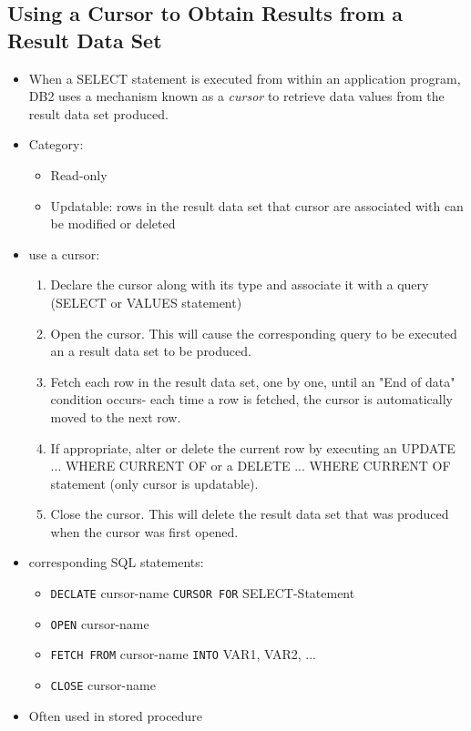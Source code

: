 \documentclass{article}
\begin{document}
\subsection{Using a Cursor to Obtain Results from a Result Data Set}
\begin{itemize}
\item When a SELECT statement is executed from within an application program, DB2 uses a mechanism
known as a \textit{cursor} to retrieve data values from the result data set produced.
\item Category:
	\begin{itemize}
	\item Read-only
	\item Updatable: rows in the result data set that cursor are associated with can be modified or
					 deleted
	\end{itemize}
\item use a cursor:
	\begin{enumerate}
	\item Declare the cursor along with its type and associate it with a query (SELECT or VALUES 
		  statement)
	\item Open the cursor. This will cause the corresponding query to be executed an a result data set
	to be produced.
	\item Fetch each row in the result data set, one by one, until an "End of data" condition occurs-
	each time a row is fetched, the cursor is automatically moved to the next row.
	\item If appropriate, alter or delete the current row by executing an UPDATE ... WHERE CURRENT OF
	or a DELETE ... WHERE CURRENT OF statement (only cursor is updatable).
	\item Close the cursor. This will delete the result data set that was produced when the cursor was 
	first opened.
	\end{enumerate}
\item corresponding SQL statements:
	\begin{itemize}
	\item \texttt{DECLATE} cursor-name \texttt{CURSOR FOR} SELECT-Statement
	\item \texttt{OPEN} cursor-name
	\item \texttt{FETCH FROM} cursor-name \texttt{INTO} VAR1, VAR2, ...
	\item \texttt{CLOSE} cursor-name
	\end{itemize}
\item Often used in stored procedure		
\end{itemize}
\end{document}
